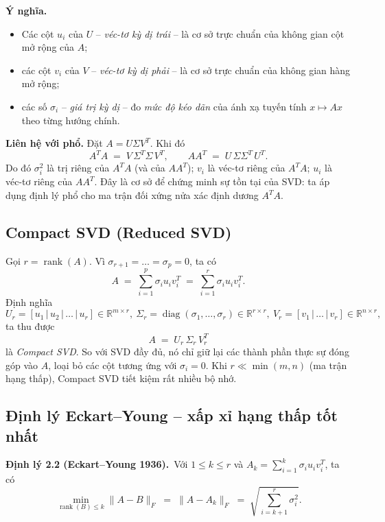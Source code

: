 \textbf{Ý nghĩa.}
\begin{itemize}
    \item Các cột $u_i$ của $U$ -- \emph{véc-tơ kỳ dị trái} -- là cơ sở trực chuẩn của
          không gian cột mở rộng của $A$;
    \item các cột $v_i$ của $V$ -- \emph{véc-tơ kỳ dị phải} -- là cơ sở trực chuẩn của
          không gian hàng mở rộng;
    \item các số $\sigma_i$ -- \emph{giá trị kỳ dị} -- đo \emph{mức độ kéo dãn} của
          ánh xạ tuyến tính $x\mapsto Ax$ theo từng hướng chính.
\end{itemize}

\textbf{Liên hệ với phổ.}
Đặt $A = U\Sigma V^T$. Khi đó
\[
A^T A \;=\; V\,\Sigma^T\Sigma\,V^T,
\qquad
A A^T \;=\; U\,\Sigma\Sigma^T\,U^T.
\]
Do đó $\sigma_i^2$ là trị riêng của $A^TA$ (và của $AA^T$); $v_i$ là véc-tơ
riêng của $A^TA$; $u_i$ là véc-tơ riêng của $AA^T$. Đây là cơ sở để chứng minh
sự tồn tại của SVD: ta áp dụng định lý phổ cho ma trận đối xứng nửa xác định
dương $A^TA$.

\subsection{Compact SVD (Reduced SVD)}

Gọi $r = \operatorname{rank}(A)$. Vì $\sigma_{r+1} = \dots = \sigma_p = 0$, ta có
\[
A \;=\; \sum_{i=1}^{p} \sigma_i u_i v_i^T \;=\; \sum_{i=1}^{r}\sigma_i u_i v_i^T.
\]
Định nghĩa
\[
U_r = [u_1 \,|\, u_2 \,|\, \dots \,|\, u_r] \in \mathbb{R}^{m\times r},\
\Sigma_r = \operatorname{diag}(\sigma_1,\dots,\sigma_r) \in \mathbb{R}^{r\times r},\
V_r = [v_1 \,|\, \dots \,|\, v_r] \in \mathbb{R}^{n\times r},
\]
ta thu được
\[
\boxed{\;A \;=\; U_r\,\Sigma_r\,V_r^T\;}
\]
là \emph{Compact SVD}. So với SVD đầy đủ, nó chỉ giữ lại các thành phần thực sự
đóng góp vào $A$, loại bỏ các cột tương ứng với $\sigma_i=0$. Khi $r \ll \min(m,n)$
(ma trận hạng thấp), Compact SVD tiết kiệm rất nhiều bộ nhớ.

\subsection{Định lý Eckart--Young -- xấp xỉ hạng thấp tốt nhất}

\begin{mdframed}[backgroundcolor=black!5]
\textbf{Định lý 2.2 (Eckart--Young 1936).}\
Với $1 \le k \le r$ và $A_k = \sum_{i=1}^{k}\sigma_i u_i v_i^T$, ta có
\[
\min_{\operatorname{rank}(B)\le k} \|A-B\|_F \;=\; \|A - A_k\|_F
\;=\; \sqrt{\sum_{i=k+1}^{r}\sigma_i^2}.
\]
\end{mdframed}

